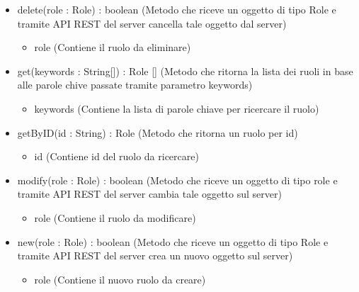 \begin{description}
\begin{itemize}
\item delete(role : Role) : boolean (Metodo che riceve un oggetto di tipo Role e tramite API REST del server cancella tale oggetto dal server)\begin{itemize}
\item role (Contiene il ruolo da eliminare)
\end{itemize}

\item get(keywords : String[]) : Role [] (Metodo che ritorna la lista dei ruoli in base alle parole chive passate tramite parametro keywords)\begin{itemize}
\item keywords (Contiene la lista di parole chiave per ricercare il ruolo)
\end{itemize}

\item getByID(id : String) : Role (Metodo che ritorna un ruolo per id)\begin{itemize}
\item id (Contiene id del ruolo da ricercare)
\end{itemize}

\item modify(role : Role) : boolean (Metodo che riceve un oggetto di tipo role e tramite API REST del server cambia tale oggetto sul server)\begin{itemize}
\item role (Contiene il ruolo da modificare)
\end{itemize}

\item new(role : Role) : boolean (Metodo che riceve un oggetto di tipo Role e tramite API REST del server crea un nuovo oggetto sul server)\begin{itemize}
\item role (Contiene il nuovo ruolo da creare)
\end{itemize}

\end{itemize}

\end{description}

